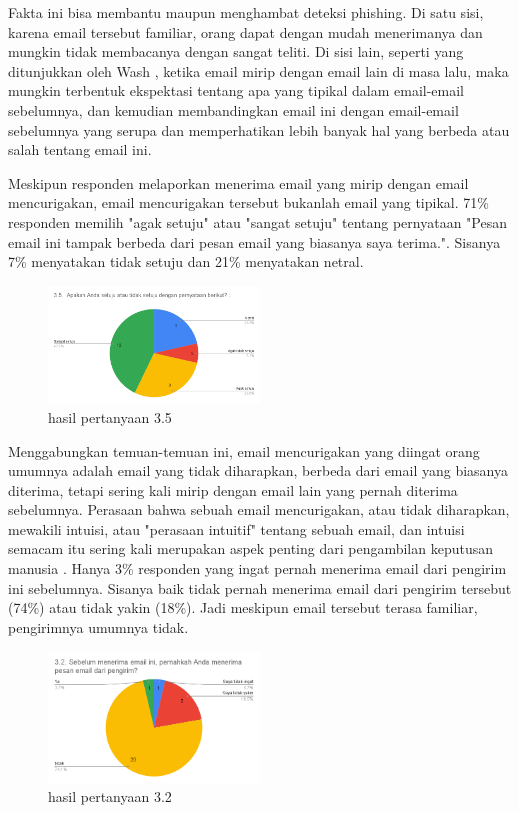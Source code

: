\documentclass[lettersize,journal]{IEEEtran}
\begin{document}
Fakta ini bisa membantu maupun menghambat deteksi phishing. Di satu sisi,
karena email tersebut familiar, orang dapat dengan mudah menerimanya
dan mungkin tidak membacanya dengan sangat teliti. Di
sisi lain, seperti yang ditunjukkan oleh Wash \cite{tigaempat}, ketika email
mirip dengan email lain di masa lalu, maka mungkin terbentuk ekspektasi
tentang apa yang tipikal dalam email-email sebelumnya, dan kemudian
membandingkan email ini dengan email-email sebelumnya yang serupa dan
memperhatikan lebih banyak hal yang berbeda atau salah tentang email ini.

Meskipun responden melaporkan menerima email yang mirip dengan email
mencurigakan, email mencurigakan tersebut bukanlah email yang tipikal. 71\%
responden memilih "agak setuju" atau "sangat setuju" tentang pernyataan "Pesan
email ini tampak berbeda dari pesan email yang biasanya saya terima.". Sisanya 
7\% menyatakan tidak setuju dan 21\% menyatakan netral.

\begin{figure}[h!]
  \centering
  \includegraphics[width=0.5\textwidth]{image/3.5.png}
  \caption{hasil pertanyaan 3.5}
  \label{fig:pertanyaan_3.5}
\end{figure}

Menggabungkan temuan-temuan ini, email mencurigakan yang diingat orang umumnya
adalah email yang tidak diharapkan, berbeda dari email yang biasanya diterima,
tetapi sering kali mirip dengan email lain yang pernah diterima sebelumnya.
Perasaan bahwa sebuah email mencurigakan, atau tidak diharapkan, mewakili
intuisi, atau "perasaan intuitif" tentang sebuah email, dan intuisi semacam itu
sering kali merupakan aspek penting dari pengambilan keputusan manusia
\cite{satudelapan}. Hanya 3\% responden yang ingat pernah menerima email dari
pengirim ini sebelumnya. Sisanya baik tidak pernah menerima email dari pengirim
tersebut (74\%) atau tidak yakin (18\%). Jadi meskipun email tersebut terasa
familiar, pengirimnya umumnya tidak. 

\begin{figure}[h!]
  \centering
  \includegraphics[width=0.5\textwidth]{image/3.2.png}
  \caption{hasil pertanyaan 3.2}
  \label{fig:pertanyaan_3.2}
\end{figure}
\end{document}
